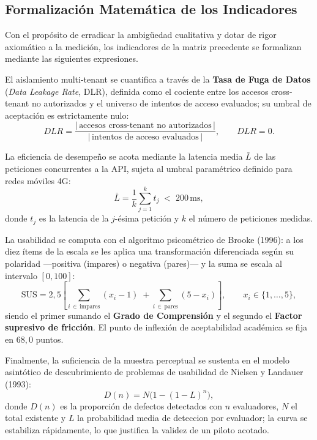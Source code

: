 \documentclass[11pt,a4paper,oneside]{report}
\begin{document}
\subsection{Formalizaci\'on Matem\'atica de los Indicadores}
Con el prop\'osito de erradicar la ambig\"uedad cualitativa y dotar de rigor axiom\'atico a la
medici\'on, los indicadores de la matriz precedente se formalizan mediante las siguientes expresiones.

El aislamiento multi-tenant se cuantifica a trav\'es de la \textbf{Tasa de Fuga de Datos}
(\textit{Data Leakage Rate}, DLR), definida como el cociente entre los accesos cross-tenant no
autorizados y el universo de intentos de acceso evaluados; su umbral de aceptaci\'on es estrictamente
nulo:
\begin{equation}
DLR = \frac{\left|\,\text{accesos cross-tenant no autorizados}\,\right|}{\left|\,\text{intentos de acceso evaluados}\,\right|}, \qquad DLR = 0.
\end{equation}

La eficiencia de desempe\~no se acota mediante la latencia media $\bar{L}$ de las peticiones
concurrentes a la API, sujeta al umbral param\'etrico definido para redes m\'oviles 4G:
\begin{equation}
\bar{L} = \frac{1}{k}\sum_{j=1}^{k} t_{j} \; < \; 200\,\text{ms},
\end{equation}
donde $t_{j}$ es la latencia de la $j$-\'esima petici\'on y $k$ el n\'umero de peticiones medidas.

La usabilidad se computa con el algoritmo psicom\'etrico de Brooke (1996): a los diez \'items de la
escala se les aplica una transformaci\'on diferenciada seg\'un su polaridad —positiva (impares) o
negativa (pares)— y la suma se escala al intervalo $[0,100]$:
\begin{equation}
\mathrm{SUS} = 2{,}5 \left[ \sum_{i\,\in\,\text{impares}} (x_i - 1) \; + \sum_{i\,\in\,\text{pares}} (5 - x_i) \right], \qquad x_i \in \{1,\dots,5\},
\end{equation}
siendo el primer sumando el \textbf{Grado de Comprensi\'on} y el segundo el \textbf{Factor supresivo de
fricci\'on}. El punto de inflexi\'on de aceptabilidad acad\'emica se fija en $68{,}0$ puntos.

Finalmente, la suficiencia de la muestra perceptual se sustenta en el modelo asint\'otico de
descubrimiento de problemas de usabilidad de Nielsen y Landauer (1993):
\begin{equation}
D(n) = N\bigl(1 - (1 - L)^{n}\bigr),
\end{equation}
donde $D(n)$ es la proporci\'on de defectos detectados con $n$ evaluadores, $N$ el total existente y
$L$ la probabilidad media de deteccion por evaluador; la curva se estabiliza r\'apidamente, lo que
justifica la validez de un piloto acotado.
\end{document}
